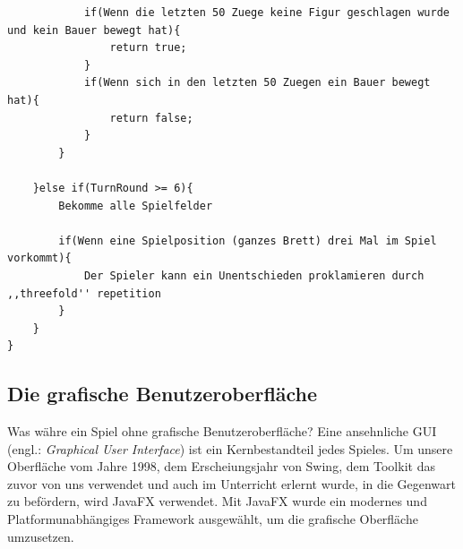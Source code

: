 \documentclass[12pt,a4paper]{article}
\begin{document}
{\begin{lstlisting}
			if(Wenn die letzten 50 Zuege keine Figur geschlagen wurde und kein Bauer bewegt hat){
				return true;
			}
			if(Wenn sich in den letzten 50 Zuegen ein Bauer bewegt hat){
				return false;
			}
		}
		
	}else if(TurnRound >= 6){
		Bekomme alle Spielfelder 	
	
		if(Wenn eine Spielposition (ganzes Brett) drei Mal im Spiel vorkommt){
			Der Spieler kann ein Unentschieden proklamieren durch ,,threefold'' repetition
		}
	}
}
\end{lstlisting}



\newpage
\subsection{Die grafische Benutzeroberfläche}
Was währe ein Spiel ohne grafische Benutzeroberfläche? Eine ansehnliche GUI (engl.: \textit{Graphical User Interface}) ist ein Kernbestandteil jedes Spieles. Um unsere Oberfläche vom Jahre 1998, dem Erscheiungsjahr von Swing, dem Toolkit das zuvor von uns verwendet und auch im Unterricht erlernt wurde, in die Gegenwart zu befördern, wird JavaFX verwendet. Mit JavaFX wurde ein modernes und Platformunabhängiges Framework ausgewählt, um die grafische Oberfläche umzusetzen.

}
\end{document}
